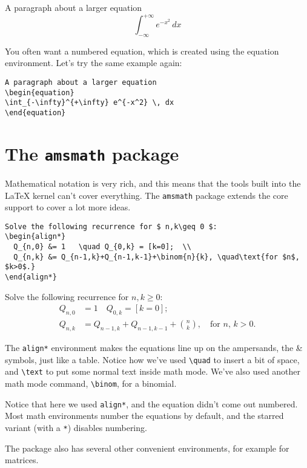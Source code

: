 \documentclass{article}
\begin{document}
A paragraph about a larger equation
\[
\int_{-\infty}^{+\infty} e^{-x^2} \, dx
\]

You often want a numbered equation, which is created using the equation environment. Let’s try the same example again:

\begin{verbatim}
A paragraph about a larger equation
\begin{equation}
\int_{-\infty}^{+\infty} e^{-x^2} \, dx
\end{equation}
\end{verbatim}

\section{The \texttt{amsmath} package}
Mathematical notation is very rich, and this means that the tools built into the LaTeX kernel can’t cover everything. The \verb|amsmath| package extends the core support to cover a lot more ideas.

\begin{verbatim}
Solve the following recurrence for $ n,k\geq 0 $:
\begin{align*}
  Q_{n,0} &= 1   \quad Q_{0,k} = [k=0];  \\
  Q_{n,k} &= Q_{n-1,k}+Q_{n-1,k-1}+\binom{n}{k}, \quad\text{for $n$, $k>0$.}
\end{align*}
\end{verbatim}

Solve the following recurrence for $ n,k\geq 0 $:
\begin{align*}
  Q_{n,0} &= 1   \quad Q_{0,k} = [k=0];  \\
  Q_{n,k} &= Q_{n-1,k}+Q_{n-1,k-1}+\binom{n}{k}, \quad\text{for $n$, $k>0$.}
\end{align*}

The \verb|align*| environment makes the equations line up on the ampersands, the \& symbols, just like a table. Notice how we’ve used \verb|\quad| to insert a bit of space, and \verb|\text| to put some normal text inside math mode. We’ve also used another math mode command, \verb|\binom|, for a binomial.

Notice that here we used \verb|align*|, and the equation didn’t come out numbered. Most math environments number the equations by default, and the starred variant (with a \verb|*|) disables numbering.
\vspace{0.5cm}

The package also has several other convenient environments, for example for matrices.
\end{document}
